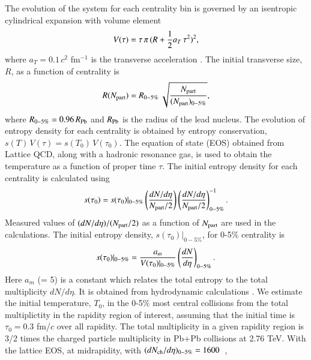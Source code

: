 \documentclass[review]{elsarticle}
\begin{document}
{  The evolution of the system for each centrality bin is governed by
  an isentropic cylindrical expansion with volume element
  \begin{equation}
    V(\tau) = \tau\,\pi\,(R + {1\over 2} a_{T} \, \tau^2 )^{2},
  \end{equation}
  where $a_{T} = 0.1\,c^2$ fm$^{-1}$ is the transverse acceleration \cite{Zhao:2011cv}.
  The initial transverse size, $R$, as a function of centrality is
  \begin{equation}
    R(N_{\rm part}) = R_{0-5\%} \, \sqrt{N_{\rm part} \over (N_{\rm part})_{0-5\%} },
    \label{RVsNPart}
  \end{equation}
  where $R_{0-5\%} = 0.96\,R_{\rm Pb}$ and $R_{\rm Pb}$ is the radius of the lead nucleus.
  The evolution of entropy density for each centrality is obtained by entropy conservation, 
  $s(T)\,V(\tau)= s(T_0)\,V(\tau_0)$.
  The equation of state (EOS) obtained from Lattice QCD, along with a hadronic resonance gas, \cite{Huovinen:2009yb} 
  is used to obtain the temperature as a function of proper time $\tau$.
  The initial entropy density for each centrality is calculated using 
  \begin{equation}
    s(\tau_0) = s(\tau_0)|_{0-5\%} \left(\frac{dN/d\eta}{N_{\rm part}/2}\right)\left(\frac{dN/d\eta}{N_{\rm part}/2}\right)^{-1}_{0-5\%}.
    \label{TempNpart}
  \end{equation}
  Measured values of $(dN/d\eta)/(N_{\rm part}/2)$ as a function of $N_{\rm part}$ 
  {\color{black} \cite{Aamodt:2010cz,Chatrchyan:2011pb}} are used in the calculations.
  The initial entropy density, $s(\tau_0)|_{0-5\%}$, for 0-5\% centrality is 
  \begin{eqnarray}
    s(\tau_0)|_{0-5\%}  = {a_{m} \over V(\tau_0)|_{0-5\%}}   \left(\frac{dN}{d\eta}\right)_{0-5\%} . 
    \label{TempVsMult}
  \end{eqnarray}  
  Here $a_m$ {\color{black}(= 5)} is a constant which relates the total entropy to the total 
  multiplicity $dN/d\eta$. It is obtained from hydrodynamic calculations \cite{Shuryak:1992wc}.
  {\color{black}
    We estimate the initial temperature, $T_0$, in the 0-5$\%$ most central collisions
    from the total multiplictity in the rapidity region of interest, assuming that the initial time is
    $\tau_0 = 0.3$ fm/$c$ over all rapidity.  The total multiplicity in a given rapidity region is
    3/2 times the charged particle multiplicity in Pb+Pb collisions at 2.76 TeV.  With the lattice
    EOS, at midrapidity, with $(dN_{\rm ch}/d\eta)_{0-5\%} = 1600$~\cite{Aamodt:2010cz,Chatrchyan:2011pb}, 
}}
\end{document}
